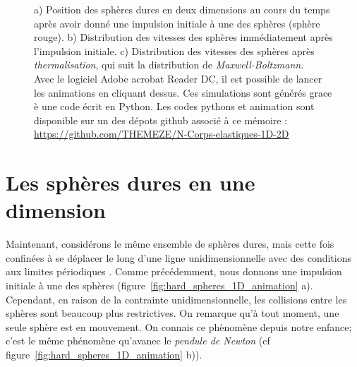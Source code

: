 \begin{figure}[H]
	\caption{a) Position des sphères dures en deux dimensions au cours du temps après avoir donné une impulsion initiale à une des sphères (sphère rouge). b) Distribution des vitesses des sphères immédiatement après l'impulsion initiale. c) Distribution des vitesses des sphères après \emph{thermalisation}, qui suit la distribution de \emph{Maxwell-Boltzmann}.\\
    Avec le logiciel Adobe acrobat Reader DC, il est possible de lancer les animations en cliquant dessus. Ces simulations sont générés grace è une code écrit en Python.
    Les codes pythons et animation sont disponible sur un des dépots github associé à ce mémoire : \url{https://github.com/THEMEZE/N-Corps-elastiques-1D-2D}
    }
	\label{fig:hard_spheres_2D_animation}
\end{figure}

\section*{Les sphères dures en une dimension}

Maintenant, considérons le même ensemble de sphères dures, mais cette fois confinées à se déplacer le long d'une ligne unidimensionnelle avec des conditions aux limites périodiques
. Comme précédemment, nous donnons une impulsion initiale à une des sphères (figure~\ref{fig:hard_spheres_1D_animation} a). Cependant, en raison de la contrainte unidimensionnelle, les collisions entre les sphères sont beaucoup plus restrictives. On remarque qu'à tout moment, une seule sphère est en mouvement. On connais ce phènomène depuis notre enfance; c'est le même phénomène qu'avanec le \emph{pendule de Newton} (cf figure~\ref{fig:hard_spheres_1D_animation} b)). 

